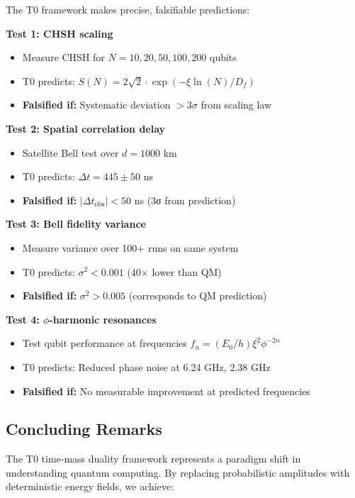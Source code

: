 The T0 framework makes precise, falsifiable predictions:

\begin{experimentbox}
	\textbf{Test 1: CHSH scaling}
	\begin{itemize}
		\item Measure CHSH for $N = 10, 20, 50, 100, 200$ qubits
		\item T0 predicts: $S(N) = 2\sqrt{2} \cdot \exp(-\xi \ln(N)/D_f)$
		\item \textbf{Falsified if:} Systematic deviation $> 3\sigma$ from scaling law
	\end{itemize}
	
	\textbf{Test 2: Spatial correlation delay}
	\begin{itemize}
		\item Satellite Bell test over $d = 1000$ km
		\item T0 predicts: $\Delta t = 445 \pm 50$ ns
		\item \textbf{Falsified if:} $|\Delta t_{\text{obs}}| < 50$ ns (3σ from prediction)
	\end{itemize}
	
	\textbf{Test 3: Bell fidelity variance}
	\begin{itemize}
		\item Measure variance over 100+ runs on same system
		\item T0 predicts: $\sigma^2 < 0.001$ (40× lower than QM)
		\item \textbf{Falsified if:} $\sigma^2 > 0.005$ (corresponds to QM prediction)
	\end{itemize}
	
	\textbf{Test 4: $\phi$-harmonic resonances}
	\begin{itemize}
		\item Test qubit performance at frequencies $f_n = (E_0/h) \xi^2 \phi^{-2n}$
		\item T0 predicts: Reduced phase noise at 6.24 GHz, 2.38 GHz
		\item \textbf{Falsified if:} No measurable improvement at predicted frequencies
	\end{itemize}
\end{experimentbox}

\subsection{Concluding Remarks}

The T0 time-mass duality framework represents a paradigm shift in understanding quantum computing. By replacing probabilistic amplitudes with deterministic energy fields, we achieve:

